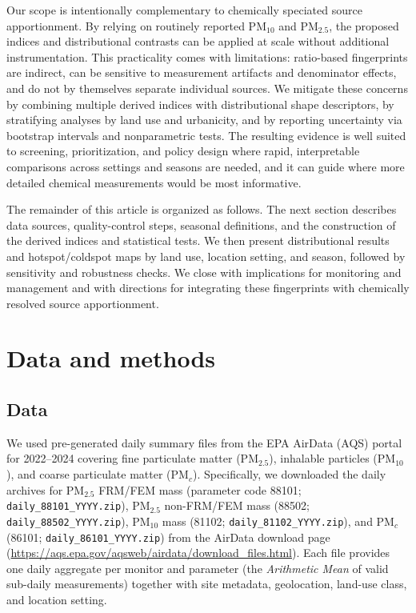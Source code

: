 \documentclass[a4paper,fleqn]{cas-sc}
\begin{document}
Our scope is intentionally complementary to chemically speciated source apportionment. By relying on routinely reported PM$_{10}$ and PM$_{2.5}$, the proposed indices and distributional contrasts can be applied at scale without additional instrumentation. This practicality comes with limitations: ratio-based fingerprints are indirect, can be sensitive to measurement artifacts and denominator effects, and do not by themselves separate individual sources. We mitigate these concerns by combining multiple derived indices with distributional shape descriptors, by stratifying analyses by land use and urbanicity, and by reporting uncertainty via bootstrap intervals and nonparametric tests. The resulting evidence is well suited to screening, prioritization, and policy design where rapid, interpretable comparisons across settings and seasons are needed, and it can guide where more detailed chemical measurements would be most informative.

The remainder of this article is organized as follows. The next section describes data sources, quality-control steps, seasonal definitions, and the construction of the derived indices and statistical tests. We then present distributional results and hotspot/coldspot maps by land use, location setting, and season, followed by sensitivity and robustness checks. We close with implications for monitoring and management and with directions for integrating these fingerprints with chemically resolved source apportionment.

\section{Data and methods}
\subsection{Data}

We used pre-generated daily summary files from the EPA AirData (AQS) portal for 2022--2024 covering fine particulate matter (PM$_{2.5}$), inhalable particles (PM$_{10}$), and coarse particulate matter (PM$_{c}$). Specifically, we downloaded the daily archives for PM$_{2.5}$ FRM/FEM mass (parameter code 88101; \texttt{daily\_88101\_YYYY.zip}), PM$_{2.5}$ non-FRM/FEM mass (88502; \texttt{daily\_88502\_YYYY.zip}), PM$_{10}$ mass (81102; \texttt{daily\_81102\_YYYY.zip}), and PM$_{c}$ (86101; \texttt{daily\_86101\_YYYY.zip}) from the AirData download page (\url{https://aqs.epa.gov/aqsweb/airdata/download_files.html}). Each file provides one daily aggregate per monitor and parameter (the \textit{Arithmetic Mean} of valid sub-daily measurements) together with site metadata, geolocation, land-use class, and location setting.
\end{document}
